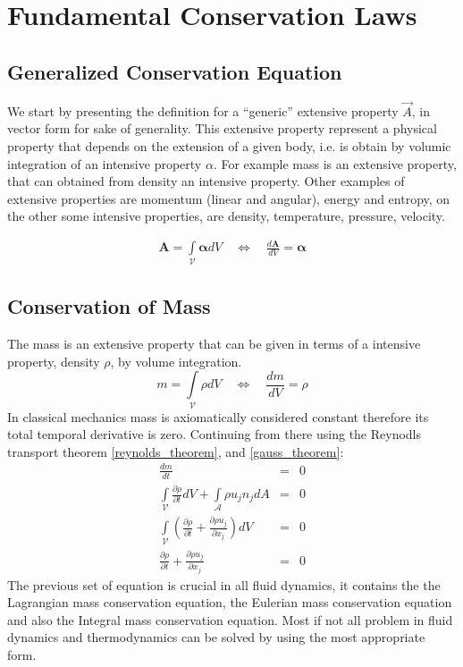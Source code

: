 \chapter{Fundamental Conservation Laws}
\label{fundamentals}

\section{Generalized Conservation Equation}
We start by presenting the definition for a ``generic'' extensive property $\vec{A}$, in vector form for sake of generality. This extensive property represent a physical property that depends on the extension of a given body, i.e. is obtain by volumic integration of an intensive property $\alpha$. For example mass is an extensive property, that can obtained from density an intensive property. Other examples of extensive properties are momentum (linear and angular), energy and entropy, on the other some intensive properties, are density, temperature, pressure, velocity.
\begin{defi}
\begin{align}
  \boldsymbol{A}=\int\limits_{\mathcal{V}} \boldsymbol\alpha dV \quad
  \Leftrightarrow \quad  \frac{d\boldsymbol A}{dV}=\boldsymbol \alpha
\end{align}
\end{defi}

\newpage

\section{Conservation of Mass}
The mass is an extensive property that can be given in terms of a intensive property, density $\rho$, by volume integration.
\begin{equation}
m=\int\limits_{\mathcal{V}}\rho dV  \quad  \Leftrightarrow \quad  \frac{dm}{dV}= \rho
\end{equation}
In classical mechanics mass is axiomatically considered constant therefore its total temporal derivative is zero. Continuing from there using the Reynodls transport theorem \eqref{reynolds_theorem}, and \eqref{gauss_theorem}:
\begin{eqnarray}
    \frac{dm}{dt} &=& 0\\
    \int\limits_{\mathcal{V}} \frac{\partial \rho}{\partial t} dV + \int\limits_{\mathcal{A}} \rho u_j n_j dA &=& 0 \\
    \int\limits_{\mathcal{V}} \left(\frac{\partial \rho}{\partial t} + \frac{\partial \rho u_j}{\partial x_j} \right) dV  &=& 0 \\
    \frac{\partial \rho}{\partial t} +  \frac{\partial \rho u_j}{\partial x_j} &=& 0
\end{eqnarray}
The previous set of equation is crucial in all fluid dynamics, it contains the the Lagrangian mass conservation equation, the Eulerian mass conservation equation and also the Integral mass conservation equation. Most if not all problem in fluid dynamics and thermodynamics can be solved by using the most appropriate form.

